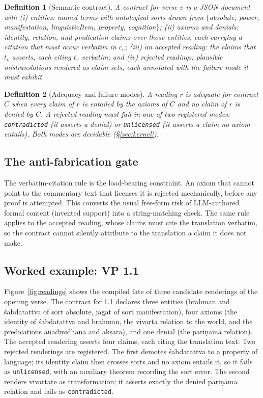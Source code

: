 \documentclass[11pt]{article}
\newtheorem{definition}{Definition}
\begin{document}
\begin{definition}[Semantic contract]
A contract for verse $v$ is a JSON document with (i) \emph{entities}: named
terms with ontological sorts drawn from $\{$absolute, power, manifestation,
linguisticItem, property, cognition$\}$; (ii) \emph{axioms} and
\emph{denials}: identity, relation, and predication claims over those
entities, each carrying a citation that must occur verbatim in $c_v$;
(iii) an \emph{accepted reading}: the claims that $t_v$ asserts, each citing
$t_v$ verbatim; and (iv) \emph{rejected readings}: plausible mistranslations
rendered as claim sets, each annotated with the failure mode it must
exhibit.
\end{definition}

\begin{definition}[Adequacy and failure modes]
A reading $r$ is \emph{adequate} for contract $C$ when every claim of $r$ is
entailed by the axioms of $C$ and no claim of $r$ is denied by $C$. A
rejected reading must fail in one of two registered modes:
\texttt{contradicted} (it asserts a denial) or \texttt{unlicensed} (it
asserts a claim no axiom entails). Both modes are decidable
(\S\ref{sec:kernel}).
\end{definition}

\subsection{The anti-fabrication gate}
The verbatim-citation rule is the load-bearing constraint. An axiom that
cannot point to the commentary text that licenses it is rejected
mechanically, before any proof is attempted. This converts the usual
free-form risk of LLM-authored formal content (invented support) into a
string-matching check. The same rule applies to the accepted reading, whose
claims must cite the translation verbatim, so the contract cannot silently
attribute to the translation a claim it does not make.

\subsection{Worked example: VP 1.1}
\label{sec:worked}
Figure~\ref{fig:readings} shows the compiled fate of three candidate
renderings of the opening verse. The contract for 1.1 declares three
entities (brahman and \'sabdatattva of sort absolute, jagat of sort
manifestation), four axioms (the identity of \'sabdatattva and brahman, the
vivarta relation to the world, and the predications an\={a}dinidhana and
ak\d{s}ara), and one denial (the pari\d{n}\={a}ma relation). The accepted
rendering asserts four claims, each citing the translation text. Two
rejected renderings are registered. The first demotes \'sabdatattva to a
property of language; its identity claim then crosses sorts and no axiom
entails it, so it fails as \texttt{unlicensed}, with an auxiliary theorem
recording the sort error. The second renders vivartate as transformation; it
asserts exactly the denied pari\d{n}\={a}ma relation and fails as
\texttt{contradicted}.
\end{document}

